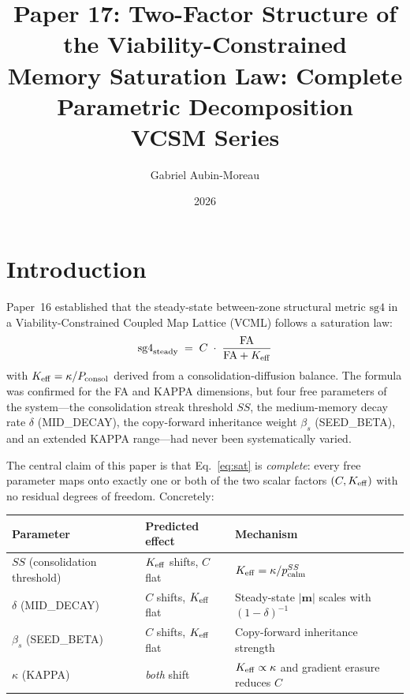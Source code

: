 \documentclass[11pt,a4paper]{article}
\title{\textbf{Paper 17: Two-Factor Structure of the Viability-Constrained\\
Memory Saturation Law: Complete Parametric Decomposition}\\[4pt]
{\large VCSM Series}}
\author{Gabriel Aubin-Moreau}
\date{2026}
\begin{document}
\maketitle
\tableofcontents
\vspace{1em}

\section{Introduction}

Paper~16 established that the steady-state between-zone structural metric $\mathrm{sg4}$
in a Viability-Constrained Coupled Map Lattice (VCML) follows a saturation law:
\begin{equation}
  \mathrm{sg4}_{\rm steady}
  \;=\;
  C \;\cdot\; \frac{\mathrm{FA}}{\mathrm{FA} + K_{\rm eff}}
  \label{eq:sat}
\end{equation}
with $K_{\rm eff} = \kappa / P_{\rm consol}$ derived from a consolidation-diffusion
balance.  The formula was confirmed for the FA and KAPPA dimensions, but four free
parameters of the system---the consolidation streak threshold $SS$, the medium-memory
decay rate $\delta$ (MID\_DECAY), the copy-forward inheritance weight $\beta_s$
(SEED\_BETA), and an extended KAPPA range---had never been systematically varied.

The central claim of this paper is that Eq.~\eqref{eq:sat} is \emph{complete}: every
free parameter maps onto exactly one or both of the two scalar factors $(C, K_{\rm eff})$
with no residual degrees of freedom.  Concretely:

\begin{center}
\begin{tabular}{lll}
\toprule
Parameter & Predicted effect & Mechanism \\
\midrule
$SS$ (consolidation threshold) & $K_{\rm eff}$ shifts, $C$ flat &
  $K_{\rm eff} = \kappa / p_{\rm calm}^{SS}$ \\
$\delta$ (MID\_DECAY) & $C$ shifts, $K_{\rm eff}$ flat &
  Steady-state $|\mathbf{m}|$ scales with $(1-\delta)^{-1}$ \\
$\beta_s$ (SEED\_BETA) & $C$ shifts, $K_{\rm eff}$ flat &
  Copy-forward inheritance strength \\
$\kappa$ (KAPPA) & \emph{both} shift &
  $K_{\rm eff} \propto \kappa$ and gradient erasure reduces $C$ \\
\bottomrule
\end{tabular}
\end{center}
\end{document}
